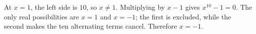 At $x=1$, the left side is $10$, so $x\ne1$. Multiplying by $x-1$ gives $x^{10}-1=0$. The only real possibilities are $x=1$ and $x=-1$; the first is excluded, while the second makes the ten alternating terms cancel. Therefore $\boxed{x=-1}$.
